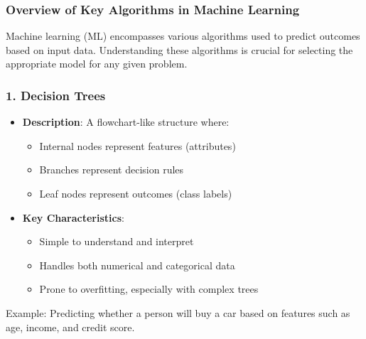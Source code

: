 \documentclass[aspectratio=169]{beamer}
\begin{document}
\begin{frame}
    \frametitle{Overview of Key Algorithms in Machine Learning}
    Machine learning (ML) encompasses various algorithms used to predict outcomes based on input data. 
    Understanding these algorithms is crucial for selecting the appropriate model for any given problem.
\end{frame}

\begin{frame}[fragile]
    \frametitle{1. Decision Trees}
    \begin{itemize}
        \item \textbf{Description}: A flowchart-like structure where:
        \begin{itemize}
            \item Internal nodes represent features (attributes)
            \item Branches represent decision rules
            \item Leaf nodes represent outcomes (class labels)
        \end{itemize}
        \item \textbf{Key Characteristics}:
        \begin{itemize}
            \item Simple to understand and interpret
            \item Handles both numerical and categorical data
            \item Prone to overfitting, especially with complex trees
        \end{itemize}
    \end{itemize}
    Example: Predicting whether a person will buy a car based on features such as age, income, and credit score.
\end{frame}
\end{document}
